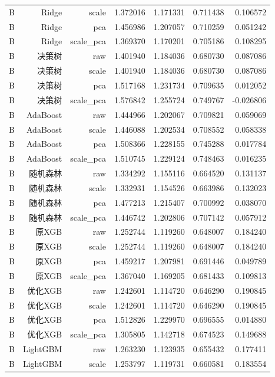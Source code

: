 \begin{longtable}{lrrrrrr}
B & Ridge & scale & 1.372016 & 1.171331 & 0.711438 & 0.106572 \\
B & Ridge & pca & 1.456986 & 1.207057 & 0.710259 & 0.051242 \\
B & Ridge & scale\_pca & 1.369370 & 1.170201 & 0.705186 & 0.108295 \\
B & 决策树 & raw & 1.401940 & 1.184036 & 0.680730 & 0.087086 \\
B & 决策树 & scale & 1.401940 & 1.184036 & 0.680730 & 0.087086 \\
B & 决策树 & pca & 1.517168 & 1.231734 & 0.709635 & 0.012052 \\
B & 决策树 & scale\_pca & 1.576842 & 1.255724 & 0.749767 & -0.026806 \\
B & AdaBoost & raw & 1.444966 & 1.202067 & 0.709821 & 0.059069 \\
B & AdaBoost & scale & 1.446088 & 1.202534 & 0.708552 & 0.058338 \\
B & AdaBoost & pca & 1.508366 & 1.228155 & 0.745288 & 0.017784 \\
B & AdaBoost & scale\_pca & 1.510745 & 1.229124 & 0.748463 & 0.016235 \\
B & 随机森林 & raw & 1.334292 & 1.155116 & 0.664520 & 0.131137 \\
B & 随机森林 & scale & 1.332931 & 1.154526 & 0.663986 & 0.132023 \\
B & 随机森林 & pca & 1.477213 & 1.215407 & 0.700992 & 0.038070 \\
B & 随机森林 & scale\_pca & 1.446742 & 1.202806 & 0.707142 & 0.057912 \\
B & 原XGB & raw & 1.252744 & 1.119260 & 0.648007 & 0.184240 \\
B & 原XGB & scale & 1.252744 & 1.119260 & 0.648007 & 0.184240 \\
B & 原XGB & pca & 1.459217 & 1.207981 & 0.691446 & 0.049789 \\
B & 原XGB & scale\_pca & 1.367040 & 1.169205 & 0.681433 & 0.109813 \\
B & 优化XGB & raw & 1.242601 & 1.114720 & 0.646290 & 0.190845 \\
B & 优化XGB & scale & 1.242601 & 1.114720 & 0.646290 & 0.190845 \\
B & 优化XGB & pca & 1.512826 & 1.229970 & 0.696555 & 0.014880 \\
B & 优化XGB & scale\_pca & 1.305805 & 1.142718 & 0.674523 & 0.149688 \\
B & LightGBM & raw & 1.263230 & 1.123935 & 0.655432 & 0.177411 \\
B & LightGBM & scale & 1.253797 & 1.119731 & 0.660581 & 0.183554 \\

\end{longtable}
